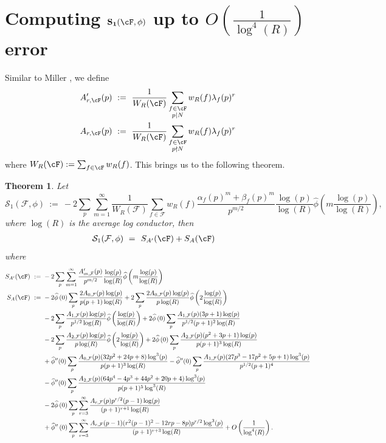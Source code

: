\documentclass[11pt, reqno]{amsart}
\newtheorem{theorem}{Theorem}[section]
\theoremstyle{definition}
\theoremstyle{remark}
\numberwithin{equation}{section}
\renewcommand{\hat}{\widehat}
\begin{document}
\section{\texorpdfstring{Computing $\mathbf{S_1(\cF,\phi)}$ up to $O\left(\frac{1}{\log^4(R)}\right)$ error}{Computing S1 up to 1/log4 error}}\label{chp: S1 compute chpt}
Similar to Miller \cite{Miller2009_LOTerms_1LevelDensity}, we define 
\begin{align} \label{def:A'_r}
    A'_{r,\cF}(p) \ &:=\ \frac{1}{W_R(\cF)}\sum_{\substack{f \in \cF \\ p|N}}w_R(f)\lambda_f(p)^r\\ \label{def:A_r}
    A_{r,\cF}(p)\  &:= \ \frac{1}{W_R(\cF)}\sum_{\substack{f \in \cF \\ p \nmid N}}w_R(f)\lambda_f(p)^r
\end{align}
where $W_R(\cF):=\sum_{f \in \cF}w_R(f)$. This brings us to the following theorem.
\begin{theorem}\label{theorem: S_1}
    Let $$\mathcal{S}_1( \mathcal{F},\phi)\ :=\ -2\sum_p\sum_{m=1}^{\infty}\frac{1}{W_{R}(\mathcal{F})}\sum_{f \in \mathcal{F}}w_R(f)\frac{\alpha_f(p)^m+\beta_f(p)^m}{p^{m/2}}\frac{\log(p)}{\log(R)}\hat{\phi}\left(m \frac{\log(p)}{\log(R)} \right),$$
    where $\log(R)$ is the average log conductor, then 
\begin{align}
\mathcal{S}_1( \mathcal{F},\phi)\ =& \ \ S_{A'}(\cF) + S_{A}(\cF) \end{align} where \small\begin{align}
  S_{A'}(\cF)\ :=\ & -2\sum_p\sum_{m=1}^{\infty}\frac{A'_{m, \mathcal{F}}(p)}{p^{m/2}}\frac{\log(p)}{\log(R)}\hat{\phi}\left(m \frac{\log(p)}{\log(R)} \right)  \\
  S_{A}(\cF)\ :=\ &-2\hat{\phi}\left(0 \right)\sum_p\frac{2A_{0, \mathcal{F}}(p)\log(p)}{p(p+1)\log(R)}+2\sum_p
\frac{2A_{0, \mathcal{F}}(p)\log(p)}{p\log(R)}\hat{\phi}\left(2 \frac{\log(p)}{\log(R)} \right) \notag \\ 
&-2\sum_p\frac{A_{1, \mathcal{F}}(p)\log(p)}{p^{1/2}\log(R)}\hat{\phi}\left(\frac{\log(p)}{\log(R)} \right)+2\hat{\phi}\left(0 \right)\sum_p\frac{A_{1,\mathcal{F}}(p)(3p+1)\log(p)}{p^{1/2}(p+1)^2\log(R)} \notag \\
&-2\sum_p\frac{A_{2,\mathcal{F}}(p)\log(p)}{p\log(R)}\hat{\phi}\left(2 \frac{\log(p)}{\log(R)} \right)+2\hat{\phi}\left(0 \right) \sum_p\frac{A_{2, \mathcal{F}}(p)(p^2+3p+1)\log(p)}{p(p+1)^3 \log(R)} \notag \\
&+\hat{\phi}''(0)\sum_p\frac{A_{0, \mathcal{F}}(p)(32p^2+24p+8)\log^3(p)}{p(p+1)^3\log(R)}-\hat{\phi}''(0)\sum_p\frac{A_{1, \mathcal{F}}(p)(27p^3-17p^2+5p+1)\log^3(p)}{p^{1/2}(p+1)^4}
\notag\\
&-\hat{\phi}''(0)\sum_p\frac{A_{2, \mathcal{F}}(p)(64p^4-4p^3+44p^2+20p+4)\log^3(p)}{p(p+1)^5\log^3(R)}\\&-2\hat{\phi}\left(0 \right)\sum_{p}\sum_{r=3}^{\infty}\frac{A_{r, \mathcal{F}}(p)p^{r/2}(p-1)\log(p)}{(p+1)^{r+1}\log(R)} \notag
\\
&+\hat{\phi}''\left(0 \right)\sum_p\sum_{r=3}^{\infty}\frac{A_{r, \mathcal{F}}(p-1)(r^2(p-1)^2-12rp-8p)p^{r/2}\log^3(p)}{(p+1)^{r+3}\log(R)}+O\left(\frac{1}{\log^4(R)} \right).
\end{align}\normalsize
\end{theorem}  
\end{document}
